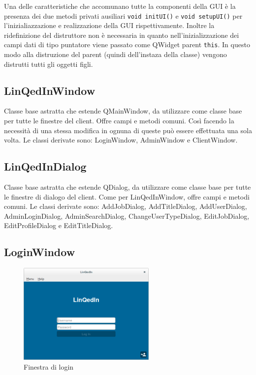 \documentclass[a4paper]{article}
\begin{document}
Una delle caratteristiche che accomunano tutte la componenti della GUI è la presenza dei due metodi privati ausiliari \texttt{void initUI()} e \texttt{void setupUI()} per l'inizialiazzazione e realizzazione della GUI rispettivamente. Inoltre la ridefinizione del distruttore non è necessaria in quanto nell'inizializzazione dei campi dati di tipo puntatore viene passato come QWidget parent \texttt{this}. In questo modo alla distruzione del parent (quindi dell'instaza della classe) vengono distrutti tutti gli oggetti figli.

\subsection*{LinQedInWindow}
Classe base astratta che estende QMainWindow, da utilizzare come classe base per tutte le finestre del client. Offre campi e metodi comuni. Così facendo la necessità di una stessa modifica in ognuna di queste può essere effettuata una sola volta. Le classi derivate sono: LoginWindow, AdminWindow e ClientWindow.

\subsection*{LinQedInDialog}
Classe base astratta che estende QDialog, da utilizzare come classe base per tutte le finestre di dialogo del client. Come per LinQedInWindow, offre campi e metodi comuni. Le classi derivate sono: AddJobDialog, AddTitleDialog, AddUserDialog, AdminLoginDialog, AdminSearchDialog, ChangeUserTypeDialog, EditJobDialog, EditProfileDialog e EditTitleDialog.

\subsection*{LoginWindow}
\begin{figure}[!ht]
\centering
\caption{Finestra di login}
\includegraphics[width=0.6\textwidth]{LoginWindow.png}
\end{figure}
\end{document}
